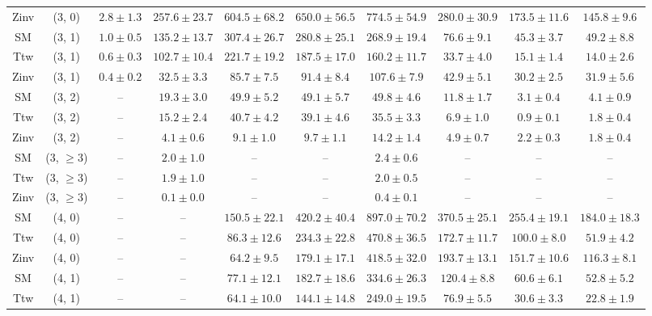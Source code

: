 \begin{table}[h!]
{\begin{tabular}{cccccccccc}
	Zinv & (3, 0) & $2.8\pm 1.3$ & $257.6\pm 23.7$ & $604.5\pm 68.2$ & $650.0\pm 56.5$ & $774.5\pm 54.9$ & $280.0\pm 30.9$ & $173.5\pm 11.6$ & $145.8\pm 9.6$ \\[0.5ex] 
	SM & (3, 1) & $1.0\pm 0.5$ & $135.2\pm 13.7$ & $307.4\pm 26.7$ & $280.8\pm 25.1$ & $268.9\pm 19.4$ & $76.6\pm 9.1$ & $45.3\pm 3.7$ & $49.2\pm 8.8$ \\[0.5ex] 
	Ttw & (3, 1) & $0.6\pm 0.3$ & $102.7\pm 10.4$ & $221.7\pm 19.2$ & $187.5\pm 17.0$ & $160.2\pm 11.7$ & $33.7\pm 4.0$ & $15.1\pm 1.4$ & $14.0\pm 2.6$ \\[0.5ex] 
	Zinv & (3, 1) & $0.4\pm 0.2$ & $32.5\pm 3.3$ & $85.7\pm 7.5$ & $91.4\pm 8.4$ & $107.6\pm 7.9$ & $42.9\pm 5.1$ & $30.2\pm 2.5$ & $31.9\pm 5.6$ \\[0.5ex] 
	SM & (3, 2) & -- & $19.3\pm 3.0$ & $49.9\pm 5.2$ & $49.1\pm 5.7$ & $49.8\pm 4.6$ & $11.8\pm 1.7$ & $3.1\pm 0.4$ & $4.1\pm 0.9$ \\[0.5ex] 
	Ttw & (3, 2) & -- & $15.2\pm 2.4$ & $40.7\pm 4.2$ & $39.1\pm 4.6$ & $35.5\pm 3.3$ & $6.9\pm 1.0$ & $0.9\pm 0.1$ & $1.8\pm 0.4$ \\[0.5ex] 
	Zinv & (3, 2) & -- & $4.1\pm 0.6$ & $9.1\pm 1.0$ & $9.7\pm 1.1$ & $14.2\pm 1.4$ & $4.9\pm 0.7$ & $2.2\pm 0.3$ & $1.8\pm 0.4$ \\[0.5ex] 
	SM & (3, $\ge3$) & -- & $2.0\pm 1.0$ & -- & -- & $2.4\pm 0.6$ & -- & -- & -- \\[0.5ex] 
	Ttw & (3, $\ge3$) & -- & $1.9\pm 1.0$ & -- & -- & $2.0\pm 0.5$ & -- & -- & -- \\[0.5ex] 
	Zinv & (3, $\ge3$) & -- & $0.1\pm 0.0$ & -- & -- & $0.4\pm 0.1$ & -- & -- & -- \\[0.5ex] 
	SM & (4, 0) & -- & -- & $150.5\pm 22.1$ & $420.2\pm 40.4$ & $897.0\pm 70.2$ & $370.5\pm 25.1$ & $255.4\pm 19.1$ & $184.0\pm 18.3$ \\[0.5ex] 
	Ttw & (4, 0) & -- & -- & $86.3\pm 12.6$ & $234.3\pm 22.8$ & $470.8\pm 36.5$ & $172.7\pm 11.7$ & $100.0\pm 8.0$ & $51.9\pm 4.2$ \\[0.5ex] 
	Zinv & (4, 0) & -- & -- & $64.2\pm 9.5$ & $179.1\pm 17.1$ & $418.5\pm 32.0$ & $193.7\pm 13.1$ & $151.7\pm 10.6$ & $116.3\pm 8.1$ \\[0.5ex] 
	SM & (4, 1) & -- & -- & $77.1\pm 12.1$ & $182.7\pm 18.6$ & $334.6\pm 26.3$ & $120.4\pm 8.8$ & $60.6\pm 6.1$ & $52.8\pm 5.2$ \\[0.5ex] 
	Ttw & (4, 1) & -- & -- & $64.1\pm 10.0$ & $144.1\pm 14.8$ & $249.0\pm 19.5$ & $76.9\pm 5.5$ & $30.6\pm 3.3$ & $22.8\pm 1.9$ \\[0.5ex] 

\end{tabular}}
\end{table}
